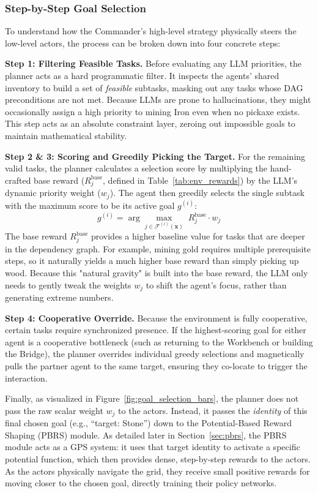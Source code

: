 \subsubsection{Step-by-Step Goal Selection}

To understand how the Commander's high-level strategy physically steers the low-level actors, the process can be broken down into four concrete steps:

\textbf{Step 1: Filtering Feasible Tasks.} 
Before evaluating any LLM priorities, the planner acts as a hard programmatic filter. It inspects the agents' shared inventory to build a set of \emph{feasible} subtasks, masking out any tasks whose DAG preconditions are not met. Because LLMs are prone to hallucinations, they might occasionally assign a high priority to mining Iron even when no pickaxe exists. This step acts as an absolute constraint layer, zeroing out impossible goals to maintain mathematical stability.

\textbf{Step 2 \& 3: Scoring and Greedily Picking the Target.} 
For the remaining valid tasks, the planner calculates a selection score by multiplying the hand-crafted base reward ($R_j^{\text{base}}$, defined in Table~\ref{tab:env_rewards}) by the LLM's dynamic priority weight ($w_j$). The agent then greedily selects the single subtask with the maximum score to be its active goal $g^{(i)}$:
\begin{equation}
\label{eq:greedy_select}
    g^{(i)} = \arg\max_{j \in \mathcal{F}^{(i)}(\mathbf{x})}\; R_j^{\text{base}} \cdot w_j
\end{equation}
The base reward $R_j^{\text{base}}$ provides a higher baseline value for tasks that are deeper in the dependency graph. For example, mining gold requires multiple prerequisite steps, so it naturally yields a much higher base reward than simply picking up wood. Because this "natural gravity" is built into the base reward, the LLM only needs to gently tweak the weights $w_j$ to shift the agent's focus, rather than generating extreme numbers.

\textbf{Step 4: Cooperative Override.} 
Because the environment is fully cooperative, certain tasks require synchronized presence. If the highest-scoring goal for either agent is a cooperative bottleneck (such as returning to the Workbench or building the Bridge), the planner overrides individual greedy selections and magnetically pulls the partner agent to the same target, ensuring they co-locate to trigger the interaction.

Finally, as visualized in Figure~\ref{fig:goal_selection_bars}, the planner does not pass the raw scalar weight $w_j$ to the actors. Instead, it passes the \emph{identity} of this final chosen goal (e.g., ``target: Stone'') down to the Potential-Based Reward Shaping (PBRS) module. As detailed later in Section~\ref{sec:pbrs}, the PBRS module acts as a GPS system: it uses that target identity to activate a specific potential function, which then provides dense, step-by-step rewards to the actors. As the actors physically navigate the grid, they receive small positive rewards for moving closer to the chosen goal, directly training their policy networks. 

